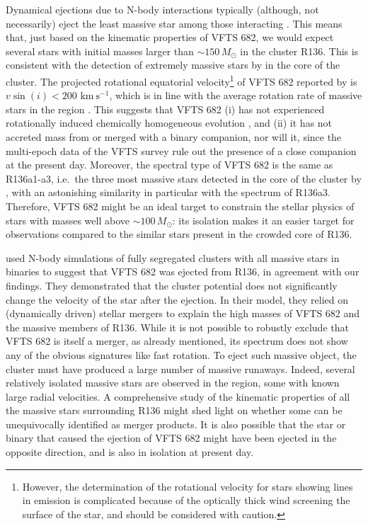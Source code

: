 \documentclass[apjl,twocolumn]{emulateapj}
\newcommand{\kms}{{\,\mathrm{km\ s^{-1}}}}
\begin{document}
Dynamical ejections due to N-body interactions typically (although, not necessarily) eject the least
massive star among those interacting \cite[e.g.,][]{banerjee:12}. This means that, just
based on the kinematic properties of VFTS 682, we would expect several
stars with initial masses larger than $\sim$$150\,M_\odot$ in the
cluster R136.
This is consistent with the detection
of extremely massive stars by \cite{crowther:10} in the core of the
cluster. The projected rotational equatorial
velocity\footnote{However, the determination of the rotational
  velocity for stars showing lines in emission is complicated because
  of the optically thick wind screening the surface of the star, and should be
  considered with caution.} of VFTS 682
reported by \cite{schneider:18} is $v\sin(i)<200\,\kms$, which is in
line with the average rotation rate of massive stars in the region
\citep[][]{ramirez-agudelo:15}. This suggests that VFTS 682 (i) has not
experienced rotationally induced chemically homogeneous evolution
\citep[][]{maeder:00,demink:09,marchant:16}, and (ii) it has not
accreted mass from or merged with a binary companion, nor will it, since the multi-epoch
data of the VFTS survey rule out the presence of a close companion at the
present day. Moreover, the spectral type of VFTS 682
\citep[WNh5,][]{bestenlehner:11} is the same as R136a1-a3, i.e.~the
three most massive stars detected in the core of the cluster by
\cite{crowther:10}, with an astonishing similarity in particular with
the spectrum of R136a3. Therefore,
VFTS 682 might be an ideal target to constrain the stellar physics of
stars with masses well above $\sim$$100\,M_\odot$: its isolation makes
it an easier target for observations compared to the similar stars
present in the crowded core of R136.

\citet{banerjee:12} used N-body simulations of fully segregated
clusters with all massive stars in binaries to suggest that VFTS 682
was ejected from R136, in agreement with our findings. They
demonstrated that the cluster potential does not significantly change
the velocity of the star after the ejection. In their
model, they relied on (dynamically driven) stellar mergers to explain the high masses of
VFTS 682 and the massive members of R136. While it is not possible to
robustly exclude that VFTS 682 is itself a merger, as already
mentioned, its spectrum does not show any of the obvious signatures
like fast rotation. To eject such massive object, the cluster must have produced
a large number of massive runaways. Indeed, several relatively
isolated massive stars are observed in the region, some with known
large radial velocities. A comprehensive study of the kinematic
properties of all the massive stars surrounding R136 might shed light
on whether some can be unequivocally identified as merger products. It
is also possible that the star or binary that caused the ejection of
VFTS 682 might have been ejected in the opposite direction, and is also
in isolation at present day. 
\end{document}
